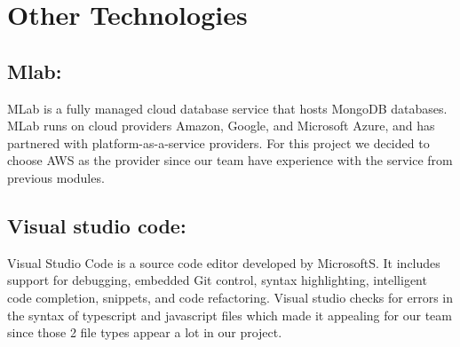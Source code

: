 \section{Other Technologies}

\subsection{Mlab:}
MLab is a fully managed cloud database service that hosts MongoDB databases. MLab runs on cloud providers Amazon, Google, and Microsoft Azure, and has partnered with platform-as-a-service providers. For this project we decided to choose AWS as the provider since our team have experience with the service from previous modules.\cite{MongoDBH41}

\subsection{Visual studio code:}
Visual Studio Code is a source code editor developed by MicrosoftS. It includes support for debugging, embedded Git control, syntax highlighting, intelligent code completion, snippets, and code refactoring. Visual studio checks for errors in the syntax of typescript and javascript files which made it appealing for our team since those 2 file types appear a lot in our project.\cite{VisualSt10}

